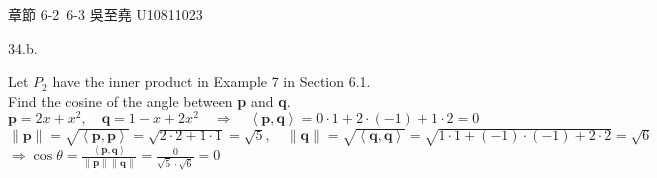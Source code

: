 \documentclass[12pt]{book}
\author{andersonwu2000}
\begin{document}
\begin{CJK}{UTF8}{bsmi}

\hfill 章節 6-2~6-3 吳至堯 U10811023


34.b. \begin{minipage}[t]{\dimexpr\linewidth}
Let $P_2$ have the inner product in Example 7 in Section 6.1. \\
Find the cosine of the angle between \textbf{p} and \textbf{q}. \\
$\textbf{p}=2x+x^2,\quad\textbf{q}=1-x+2x^2\quad\Rightarrow\quad\left\langle \textbf{p},\textbf{q} \right\rangle=0\cdot1+2\cdot(-1)+1\cdot2=0$ \\
$\parallel\textbf{p}\parallel=\sqrt{\left\langle \textbf{p},\textbf{p} \right\rangle}=\sqrt{2\cdot2+1\cdot1}=\sqrt{5},\quad\parallel\textbf{q}\parallel=\sqrt{\left\langle \textbf{q},\textbf{q} \right\rangle}=\sqrt{1\cdot1+(-1)\cdot(-1)+2\cdot2}=\sqrt{6}$ \\
$\displaystyle\Rightarrow\cos\theta=\frac{\left\langle \textbf{p},\textbf{q} \right\rangle}{\parallel\textbf{p}\parallel\parallel\textbf{q}\parallel}=\frac{0}{\sqrt{5}\cdot\sqrt{6}}=0$
\end{minipage}\\


\end{CJK}
\end{document}

